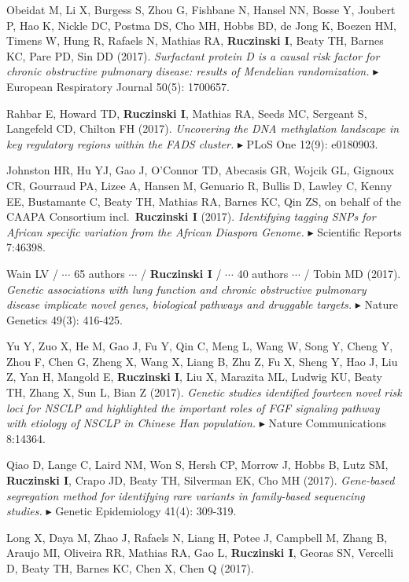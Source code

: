 \documentclass[10pt]{article}
\newcommand{\dg}[1]{{\color{black} $\blacktriangleright$ {#1}}}
\begin{document}
Obeidat M, Li X, Burgess S, Zhou G, Fishbane N, Hansel NN, Bosse Y, Joubert P, Hao K, Nickle DC, Postma DS, Cho MH, Hobbs BD, de Jong K, Boezen HM, Timens W, Hung R, Rafaels N, Mathias RA, {\bf Ruczinski I}, Beaty TH, Barnes KC, Pare PD, Sin DD (2017).
{\it Surfactant protein D is a causal risk factor for chronic obstructive pulmonary disease: results of Mendelian randomization.}
\dg{European Respiratory Journal 50(5): 1700657.}
\item 
Rahbar E, Howard TD, {\bf Ruczinski I}, Mathias RA, Seeds MC, Sergeant S, Langefeld CD, Chilton FH (2017).
{\it Uncovering the DNA methylation landscape in key regulatory regions within the FADS cluster.}
\dg{PLoS One 12(9): e0180903.}
\item 
Johnston HR, Hu YJ, Gao J, O'Connor TD, Abecasis GR, Wojcik GL, Gignoux CR, Gourraud PA, Lizee A, Hansen M, Genuario R, Bullis D, Lawley C, Kenny EE, Bustamante C, Beaty TH, Mathias RA, Barnes KC, Qin ZS, on behalf of the CAAPA Consortium incl.~{\bf Ruczinski I} (2017).
{\it Identifying tagging SNPs for African specific variation from the African Diaspora Genome.}
\dg{Scientific Reports 7:46398.}
\item 
Wain LV / $\cdots$ 65 authors $\cdots$ / {\bf Ruczinski I} / $\cdots$ 40 authors $\cdots$ / Tobin MD (2017).
{\it Genetic associations with lung function and chronic obstructive pulmonary disease implicate novel genes, biological pathways and druggable targets.} 
\dg{Nature Genetics 49(3): 416-425.}
\item
Yu Y, Zuo X, He M, Gao J, Fu Y, Qin C, Meng L, Wang W, Song Y, Cheng Y, Zhou F,  Chen G, Zheng X, Wang X, Liang B, Zhu Z, Fu X, Sheng Y, Hao J, Liu Z, Yan H, Mangold E, {\bf Ruczinski I}, Liu X, Marazita ML, Ludwig KU, Beaty TH, Zhang X, Sun L, Bian Z (2017).
{\it Genetic studies identified fourteen novel risk loci for NSCLP and highlighted the important roles of FGF signaling pathway with etiology of NSCLP in Chinese Han population.} 
\dg{Nature Communications 8:14364.}
\item 
Qiao D, Lange C, Laird NM, Won S, Hersh CP, Morrow J, Hobbs B, Lutz SM, {\bf Ruczinski I}, Crapo JD, Beaty TH, Silverman EK, Cho MH (2017).
{\it Gene-based segregation method for identifying rare variants in family-based sequencing studies.}
\dg{Genetic Epidemiology 41(4): 309-319.}
\item 
Long X, Daya M, Zhao J, Rafaels N, Liang H, Potee J, Campbell M, Zhang B, Araujo MI, Oliveira RR, Mathias RA, Gao L, {\bf Ruczinski I}, Georas SN, Vercelli D, Beaty TH, Barnes KC, Chen X, Chen Q (2017).
\end{document}
